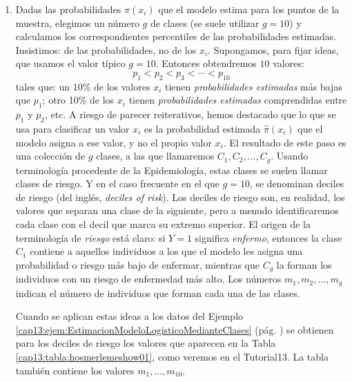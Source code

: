 \begin{enumerate}
\item Dadas las probabilidades $\hat{\pi}(x_i)$ que el modelo estima para los puntos de la muestra, elegimos un número $g$ de clases (se suele utilizar $g = 10$) y calculamos los correspondientes percentiles de las probabilidades estimadas. Insistimos: de las probabilidades, no de los $x_i$. Supongamos, para fijar ideas, que usamos el valor típico $g=10$. Entonces obtendremos $10$ valores:
    \[ p_1 < p_2 < p_3 < \cdots < p_{10}\]
    tales que: un 10\% de los valores $x_i$ tienen {\em probabilidades estimadas} más bajas que $p_1$; otro 10\% de los $x_i$ tienen {\em probabilidades estimadas} comprendidas entre $p_1$ y $p_2$, etc. A riesgo de parecer reiterativos, hemos destacado que lo que se usa para clasificar un valor $x_i$ es la probabilidad estimada $\hat{\pi}(x_i)$ que el modelo asigna a ese valor, y no el propio valor $x_i$. El resultado de este paso es una colección de $g$ clases, a las que llamaremos $C_1, C_2, \ldots, C_g$. Usando terminología procedente de la Epidemiología, estas clases se suelen llamar {\sf clases de riesgo}. Y en el caso frecuente en el que $g = 10$, se denominan {\sf deciles de riesgo} (del inglés, {\em deciles of risk}). Los deciles de riesgo son, en realidad, los valores que separan una clase de la siguiente, pero a menudo identificaremos cada clase con el decil que marca su extremo superior. El origen de la terminología de {\em riesgo} está claro: si $Y=1$ significa {\em enfermo}, entonces la clase $C_1$ contiene a aquellos individuos a los que el modelo les asigna una probabilidad o riesgo más bajo de enfermar, mientras que $C_g$ la forman los individuos con un riesgo de enfermedad más alto. Los números $m_1, m_2, \ldots, m_g$ indican el número de individuos que forman cada una de las clases.

    \begin{ejemplo}
    \label{cap13:ejem:hosmerlemeshow01}
    Cuando se aplican estas ideas a los datos del Ejemplo \ref{cap13:ejem:EstimacionModeloLogisticoMedianteClases} (pág. \pageref{cap13:ejem:EstimacionModeloLogisticoMedianteClases}) se obtienen para los deciles de riesgo los valores que aparecen en la Tabla \ref{cap13:tabla:hosmerlemeshow01}, como veremos en el Tutorial13. La tabla también contiene los valores $m_1, \ldots, m_{10}$.


\end{ejemplo}
\end{enumerate}
